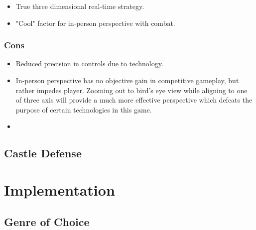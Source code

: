 \begin{itemize}
	\item True three dimensional real-time strategy.
	\item "Cool" factor for in-person perspective with combat.
\end{itemize}

\subsubsection{Cons}

\begin{itemize}
	\item Reduced precision in controls due to technology.
	\item In-person perspective has no objective gain in competitive gameplay, but rather impedes player. Zooming out to bird's eye view while aligning to one of three axis will provide a much more effective perspective which defeats the purpose of certain technologies in this game.
	\item 
\end{itemize}

\subsection{Castle Defense}

\section{Implementation}

\subsection{Genre of Choice}

\subsection{}

